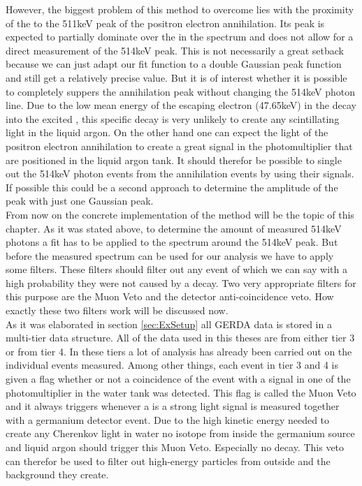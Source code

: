 However, the biggest problem of this method to overcome lies with the proximity of the \Kr to the 511keV peak of the positron electron annihilation. 
Its peak is expected to partially dominate over the \Kr in the spectrum and does not allow for a direct measurement of the 514keV peak. 
This is not necessarily a great setback because we can just adapt our fit function to a double Gaussian peak function and still get a relatively precise value.
But it is of interest whether it is possible to completely suppers the annihilation peak without changing the 514keV photon line.
Due to the low mean energy of the escaping electron (47.65keV) in the \Kr decay into the excited , this specific decay is very unlikely to create any scintillating light in the liquid argon. 
On the other hand one can expect the light of the positron electron annihilation to create a great signal in the photomultiplier that are positioned in the liquid argon tank.
It should therefor be possible to single out the 514keV photon events from the annihilation events by using their signals.
If possible this could be a second approach to determine the amplitude of the peak with just one Gaussian peak.
\\

From now on the concrete implementation of the method will be the topic of this chapter.
As it was stated above, to determine the amount of measured 514keV photons a fit has to be applied to the spectrum around the 514keV peak. 
But before the measured spectrum can be used for our analysis we have to apply some filters.
These filters should filter out any event of which we can say with a high probability they were not caused by a \Kr decay.
Two very appropriate filters for this purpose are the Muon Veto and the detector anti-coincidence veto.
How exactly these two filters work will be discussed now.
\\

As it was elaborated in section \ref{sec:ExSetup} all GERDA data is stored in a multi-tier data structure. 
All of the data used in this theses are from either tier 3 or from tier 4.
In these tiers a lot of analysis has already been carried out on the individual events measured. 
Among other things, each event in tier 3 and 4 is given a flag whether or not a coincidence of the event with a signal in one of the photomultiplier in the water tank was detected.
This flag is called the Muon Veto and it always triggers whenever a is a strong light signal is measured together with a germanium detector event.
Due to the high kinetic energy needed to create any Cherenkov light in water no isotope from inside the germanium source and liquid argon should trigger this Muon Veto.
Especially no \Kr decay. 
This veto can therefor be used to filter out high-energy particles from outside and the background they create.
\\

